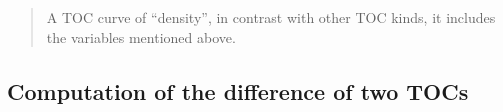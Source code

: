 \documentclass[letterpaper,10pt,english]{sphinxmanual}
\begin{document}
\begin{fulllineitems}
\begin{quote}
\begin{description}
\begin{itemize}
\end{itemize}

\sphinxAtStartPar
A TOC curve of  “density”, in contrast with other TOC kinds, it includes the variables mentioned above.

\sphinxAtStartPar
{}

\end{description}\end{quote}

\end{fulllineitems}



\subsection{Computation of the difference of two TOCs}
\label{\detokenize{usage:computation-of-the-difference-of-two-tocs}}
\end{document}
